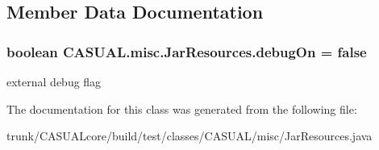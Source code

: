 \subsection{Member Data Documentation}
\hypertarget{class_c_a_s_u_a_l_1_1misc_1_1_jar_resources_af1fa14750d2d0b217ac8f5b0ec807a10}{
\subsubsection[{debug\-On}]{\setlength{\rightskip}{0pt plus 5cm}boolean C\-A\-S\-U\-A\-L.\-misc.\-Jar\-Resources.\-debug\-On = false}}\label{class_c_a_s_u_a_l_1_1misc_1_1_jar_resources_af1fa14750d2d0b217ac8f5b0ec807a10}
external debug flag 

The documentation for this class was generated from the following file\-:\begin{DoxyCompactItemize}
\item 
trunk/\-C\-A\-S\-U\-A\-Lcore/build/test/classes/\-C\-A\-S\-U\-A\-L/misc/Jar\-Resources.\-java\end{DoxyCompactItemize}
